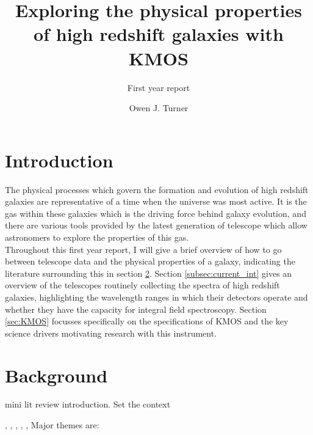 \documentclass{literature}
\title{Exploring the physical properties of high redshift galaxies with KMOS}
\subtitle{First year report}
\author{Owen J. Turner}
\begin{document}
\coverpage





\section{Introduction}\label{sec:Intro}
The physical processes which govern the formation and evolution of high redshift galaxies are representative of a time when the universe was most active. It is the gas within these galaxies which is the driving force behind galaxy evolution, and there are various tools provided by the latest generation of telescope which allow astronomers to explore the properties of this gas. \\ 



Throughout this first year report, I will give a brief overview of how to go between telescope data and the physical properties of a galaxy, indicating the literature surrounding this in section \ref{sec:background}. Section \ref{subsec:current_int} gives an overview of the telescopes 
routinely collecting the spectra of high redshift galaxies, highlighting the wavelength ranges in which their detectors operate and whether 
they have the capacity for integral field spectroscopy. Section \ref{sec:KMOS} focusses specifically on the specifications of KMOS and the key science drivers motivating research with this instrument. 





\section{Background}\label{sec:background}
mini lit review introduction. Set the context 

\citep{Troncoso_2014}, \citep{Maiolino2008}, \citep{Cullen2014}, \citep{Kewley2002}, \citep{Kennicutt_2012}, \citep{Tremonti2004} \citep{Brinchmann2004} \citep{Savaglio2005} \citep{Erb_2006} \citep{Kewley_2008} \citep{ForsterSchreiber2009} \citep{Steidel2014}
Major themes are: 
\end{document}
